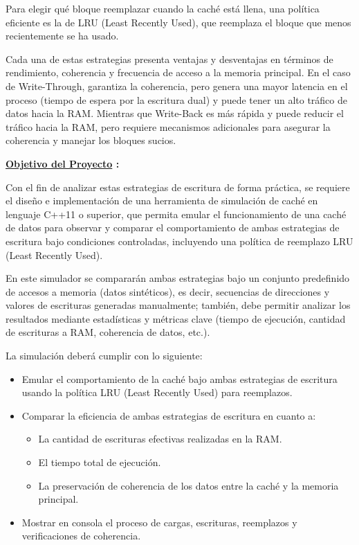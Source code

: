 \documentclass{article}
\begin{document}
\quad

{Para elegir qué bloque reemplazar cuando la caché está llena, una política eficiente es la de LRU (Least Recently Used), que reemplaza el bloque que menos recientemente se ha usado.}

\quad

{Cada una de estas estrategias presenta ventajas y desventajas en términos de rendimiento, coherencia y frecuencia de acceso a la memoria principal. En el caso de Write-Through, garantiza la coherencia, pero genera una mayor latencia en el proceso (tiempo de espera por la escritura dual) y puede tener un alto tráfico de datos hacia la RAM. Mientras que Write-Back es más rápida y puede reducir el tráfico hacia la RAM, pero requiere mecanismos adicionales para asegurar la coherencia y manejar los bloques sucios.}

\quad


\textbf{ \underline{Objetivo del Proyecto} :}

\quad

{Con el fin de analizar estas estrategias de escritura de forma práctica, se requiere el diseño e implementación de una herramienta de simulación de caché en lenguaje C++11 o superior, que permita emular el funcionamiento de una caché de datos para observar y comparar el comportamiento de ambas estrategias de escritura bajo condiciones controladas, incluyendo una  política de reemplazo LRU (Least Recently Used).}

\quad

{En este simulador se compararán ambas estrategias bajo un conjunto predefinido de accesos a memoria (datos sintéticos), es decir, secuencias de direcciones y valores de escrituras generadas manualmente; también, debe permitir analizar los resultados mediante estadísticas y métricas clave (tiempo de ejecución, cantidad de escrituras a RAM, coherencia de datos, etc.).
}


\quad

{La simulación deberá cumplir con lo siguiente:}



\begin{itemize}
    \item Emular el comportamiento de la caché bajo ambas estrategias de escritura usando la política LRU (Least Recently Used) para reemplazos.
    \item Comparar la eficiencia de ambas estrategias de escritura en cuanto a: 

     \begin{itemize}
        \item La cantidad de escrituras efectivas realizadas en la RAM.
        \item El tiempo total de ejecución.
        \item La preservación de coherencia de los datos entre la caché y la memoria principal.
    \end{itemize}

    \item Mostrar en consola el proceso de cargas, escrituras, reemplazos y verificaciones de coherencia.
   
\end{itemize}
\end{document}

